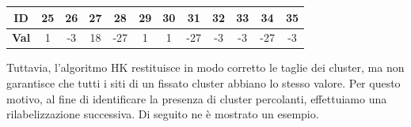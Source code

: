 \vspace{10px}
\noindent
\begin{tabular}{|c|*{11}{c|}}
	\hline
	\textbf{ID}   & 25 & 26 & 27 & 28 & 29 & 30 & 31 & 32 & 33 & 34 & 35 \\
	\hline
	\textbf{Val}  & 1 & -3 & 18 & -27 & 1 & 1 & -27 & -3 & -3 & -27 & -3 \\
	\hline
\end{tabular}

\vspace{15px}
\noindent
Tuttavia, l’algoritmo HK restituisce in modo corretto le taglie dei cluster, ma non garantisce che tutti i siti di un fissato cluster abbiano lo stesso valore. Per questo motivo, al fine di identificare la presenza di cluster percolanti, effettuiamo una rilabelizzazione successiva. Di seguito ne è mostrato un esempio.

